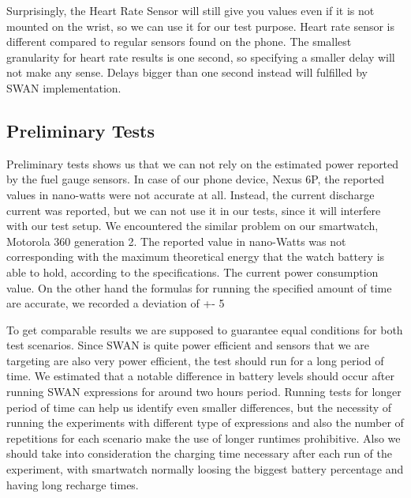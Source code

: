 Surprisingly, the Heart Rate Sensor will still give you values even if it is not mounted on the wrist, so we can use it for our test purpose. 
Heart rate sensor is different compared to regular sensors found on the phone. The smallest granularity for heart rate results is one second,
so specifying a smaller delay will not make any sense.  Delays bigger than one second instead will fulfilled by SWAN implementation.
 
 \subsection{Preliminary Tests}
Preliminary tests shows us that we can not rely on the estimated power reported by the fuel gauge sensors. In case of our phone device,
Nexus 6P, the reported values in nano-watts were not accurate at all. Instead, the current discharge current was reported, 
but we can not use it in our tests, since it will interfere with our test setup.
We encountered the similar problem on our smartwatch, Motorola 360 generation 2. 
The reported value in nano-Watts was not corresponding with the maximum theoretical energy that the watch battery is able to hold, according to the specifications.
The current power consumption value.
On the other hand the formulas for running the specified amount of time are accurate, we recorded a deviation of +- 5%

To get comparable results we are supposed to guarantee equal conditions for both test scenarios.
Since SWAN is quite power efficient and sensors that we are targeting are also very power efficient, the test should run for a long period of time.
We estimated that a notable difference in battery levels should occur after running SWAN expressions for around two hours period.
Running tests for longer period of time can help us identify even smaller differences, 
but the necessity of running the experiments with different type of expressions and also the number of repetitions for each scenario make the use of longer runtimes prohibitive.
Also we should take into consideration the charging time necessary after each run of the experiment,
with smartwatch normally loosing the biggest battery percentage  and having long recharge times.

